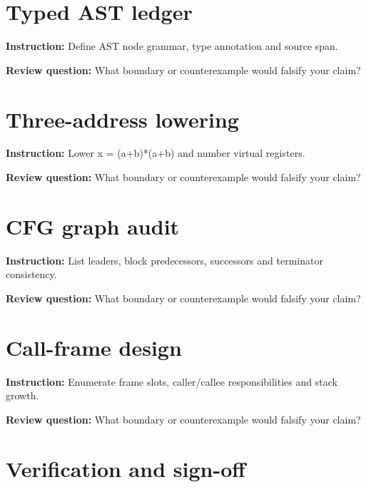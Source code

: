 \documentclass[10pt,letterpaper]{article}
\begin{document}
\section{Typed AST ledger}
\textbf{Instruction:} Define AST node grammar, type annotation and source span.\par{}
\textbf{Review question:} What boundary or counterexample would falsify your claim?\par\section{Three-address lowering}
\textbf{Instruction:} Lower x = (a+b)*(a+b) and number virtual registers.\par{}
\textbf{Review question:} What boundary or counterexample would falsify your claim?\par\section{CFG graph audit}
\textbf{Instruction:} List leaders, block predecessors, successors and terminator consistency.\par{}
\textbf{Review question:} What boundary or counterexample would falsify your claim?\par\section{Call-frame design}
\textbf{Instruction:} Enumerate frame slots, caller/callee responsibilities and stack growth.\par{}
\textbf{Review question:} What boundary or counterexample would falsify your claim?\par\section{Verification and sign-off}
\end{document}

